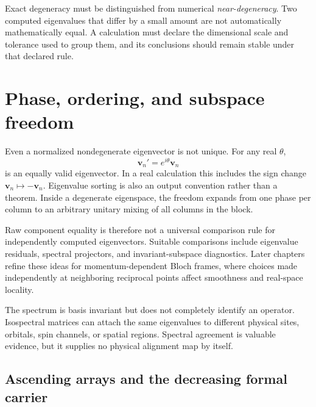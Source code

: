 Exact degeneracy must be distinguished from numerical \emph{near-degeneracy}.
Two computed eigenvalues that differ by a small amount are not automatically
mathematically equal. A calculation must declare the dimensional scale and
tolerance used to group them, and its conclusions should remain stable under
that declared rule.

\section{Phase, ordering, and subspace freedom}

Even a normalized nondegenerate eigenvector is not unique. For any real
\(\theta\),
\begin{equation}
  \mathbf v_n' = e^{i\theta}\mathbf v_n
\end{equation}
is an equally valid eigenvector. In a real calculation this includes the sign
change \(\mathbf v_n\mapsto-\mathbf v_n\). Eigenvalue sorting is also an output
convention rather than a theorem. Inside a degenerate eigenspace, the freedom
expands from one phase per column to an arbitrary unitary mixing of all columns
in the block.

Raw component equality is therefore not a universal comparison rule for
independently computed eigenvectors. Suitable comparisons include eigenvalue
residuals, spectral projectors, and invariant-subspace diagnostics. Later
chapters refine these ideas for momentum-dependent Bloch frames, where choices
made independently at neighboring reciprocal points affect smoothness and
real-space locality.

The spectrum is basis invariant but does not completely identify an operator.
Isospectral matrices can attach the same eigenvalues to different physical
sites, orbitals, spin channels, or spatial regions. Spectral agreement is
valuable evidence, but it supplies no physical alignment map by itself.

\subsection{Ascending arrays and the decreasing formal carrier}
\label{sec:training-spectral-order-bridge}

